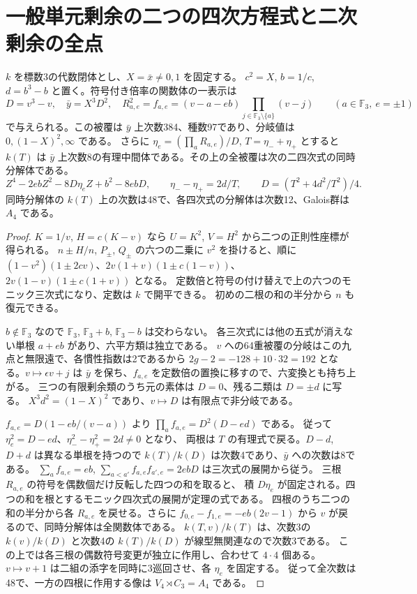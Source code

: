 \section{一般単元剰余の二つの四次方程式と二次剰余の全点}
\label{sec:rank-fifteen-unit-quartic-towers}
\begin{theorem}\label{thm:rank-fifteen-unit-quartic-towers}
$k$ を標数3の代数閉体とし、$X=\bar x\ne0,1$ を固定する。
$c^2=X$, $b=1/c$, $d=b^3-b$ と置く。符号付き倍率の関数体の一表示は
\[
 D=v^3-v,\quad \bar y=X^3D^2,\quad
 R_{a,e}^2=f_{a,e}=(v-a-e b)\!\prod_{j\in\mathbb F_3\setminus\{a\}}(v-j)
 \qquad(a\in\mathbb F_3,\ e=\pm1)
\]
で与えられる。この被覆は $\bar y$ 上次数384、種数97であり、分岐値は $0,(1-X)^2,\infty$ である。
さらに $\eta_e=(\prod_a R_{a,e})/D$, $T=\eta_-+\eta_+$ とすると $k(T)$ は
$\bar y$ 上次数8の有理中間体である。その上の全被覆は次の二四次式の同時分解体である。
\[
 Z^4-2e b Z^2-8D\eta_e Z+b^2-8e bD,\qquad
 \eta_--\eta_+=2d/T,\qquad D=(T^2+4d^2/T^2)/4 .
\]
同時分解体の $k(T)$ 上の次数は48で、各四次式の分解体は次数12、Galois群は $A_4$ である。
\end{theorem}
\begin{proof}
$K=1/v$, $H=c(K-v)$ なら $U=K^2$, $V=H^2$ から二つの正則性座標が得られる。
$n\pm H/n$, $P_\pm$, $Q_\pm$ の六つの二乗に $v^2$ を掛けると、順に
$(1-v^2)(1\pm2cv)$、$2v(1+v)(1\pm c(1-v))$、$2v(1-v)(1\pm c(1+v))$ となる。
定数倍と符号の付け替えで上の六つのモニック三次式になり、定数は $k$ で開平できる。
初めの二根の和の半分から $n$ も復元できる。

$b\notin\mathbb F_3$ なので $\mathbb F_3$, $\mathbb F_3+b$, $\mathbb F_3-b$ は交わらない。
各三次式には他の五式が消えない単根 $a+e b$ があり、六平方類は独立である。
$v$ への64重被覆の分岐はこの九点と無限遠で、各慣性指数は2であるから
$2g-2=-128+10\cdot32=192$ となる。$v\mapsto\epsilon v+j$ は
$\bar y$ を保ち、$f_{a,e}$ を定数倍の置換に移すので、六変換とも持ち上がる。
三つの有限剰余類のうち元の素体は $D=0$、残る二類は $D=\pm d$ に写る。
$X^3 d^2=(1-X)^2$ であり、$v\mapsto D$ は有限点で非分岐である。

$f_{a,e}=D(1-e b/(v-a))$ より $\prod_a f_{a,e}=D^2(D-e d)$ である。
従って $\eta_e^2=D-e d$、$\eta_-^2-\eta_+^2=2d\ne0$ となり、
両根は $T$ の有理式で戻る。$D-d$, $D+d$ は異なる単根を持つので
$k(T)/k(D)$ は次数4であり、$\bar y$ への次数は8である。
$\sum_a f_{a,e}=e b$, $\sum_{a<a'} f_{a,e}f_{a',e}=2e bD$ は三次式の展開から従う。
三根 $R_{a,e}$ の符号を偶数個だけ反転した四つの和を取ると、
積 $D\eta_e$ が固定される。四つの和を根とするモニック四次式の展開が定理の式である。
四根のうち二つの和の半分から各 $R_{a,e}$ を戻せる。さらに
$f_{0,e}-f_{1,e}=-e b(2v-1)$ から $v$ が戻るので、同時分解体は全関数体である。
$k(T,v)/k(T)$ は、次数3の $k(v)/k(D)$ と次数4の $k(T)/k(D)$ が線型無関連なので次数3である。
この上では各三根の偶数符号変更が独立に作用し、合わせて $4\cdot4$ 個ある。
$v\mapsto v+1$ は二組の添字を同時に3巡回させ、各 $\eta_e$ を固定する。
従って全次数は48で、一方の四根に作用する像は $V_4\rtimes C_3=A_4$ である。
\end{proof}

